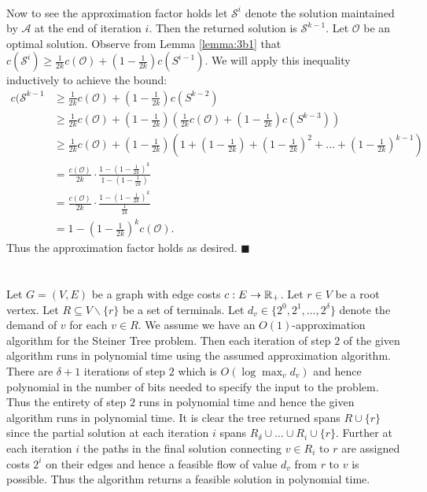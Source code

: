 \documentclass[letterpaper,12pt,oneside,onecolumn]{article}
\newcommand{\cA}{\mathcal{A}} \newcommand{\cB}{\mathcal{B}}
\newcommand{\cO}{\mathcal{O}} \newcommand{\cP}{\mathcal{P}}
\newcommand{\cS}{\mathcal{S}} \newcommand{\cT}{\mathcal{T}}
\begin{document}
\paragraph{} 
Now to see the approximation factor holds let $\cS^i$ denote the solution maintained by $\cA$ at the end of iteration $i$. Then the returned solution is $\cS^{k-1}$. Let $\cO$ be an optimal solution. Observe from Lemma \ref{lemma:3b1} that $c(\cS^{i}) \geq \frac{1}{2k} c(\cO) + (1- \frac{1}{2k})c(S^{i-1})$. We will apply this inequality inductively to achieve the bound:
\begin{align*}
c(\cS^{k-1} &\geq \frac{1}{2k} c(\cO) + (1- \frac{1}{2k})c(S^{k-2}) \\
		&\geq \frac{1}{2k} c(\cO) + (1- \frac{1}{2k})(\frac{1}{2k} c(\cO) + (1- \frac{1}{2k})c(S^{k-3})) \\
		&\geq \frac{1}{2k} c(\cO) + (1- \frac{1}{2k})(1 + (1-\frac{1}{2k}) + (1-\frac{1}{2k})^2 + \dots + (1-\frac{1}{2k})^{k-1}) \\
		&= \frac{c(\cO)}{2k} \cdot \frac{1-(1-\frac{1}{2k})^k}{1-(1-\frac{1}{2k})} \\
		&=\frac{c(\cO)}{2k} \cdot \frac{1-(1-\frac{1}{2k})^k}{\frac{1}{2k}}\\
		&= 1-(1-\frac{1}{2k})^kc(\cO).
\end{align*}
Thus the approximation factor holds as desired. $\blacksquare$
\section{}
\paragraph{}
Let $G = (V,E)$ be a graph with edge costs $c: E \rightarrow \mathbb{R}_+$. Let $r \in V$ be a root vertex. Let $R \subseteq V \backslash \{r\}$ be a set of terminals. Let $d_v \in \{2^0, 2^1, \dots, 2^\delta\}$ denote the demand of $v$ for each $v \in R$. We assume we have an $O(1)$-approximation algorithm for the Steiner Tree problem. Then each iteration of step $2$ of the given algorithm runs in polynomial time using the assumed approximation algorithm. There are $\delta+1$ iterations of step $2$ which is $O(\log \max_v d_v)$ and hence polynomial in the number of bits needed to specify the input to the problem. Thus the entirety of step $2$ runs in polynomial time and hence the given algorithm runs in polynomial time. It is clear the tree returned spans $R \cup \{r\}$ since the partial solution at each iteration $i$ spans $R_\delta \cup \dots \cup R_i \cup \{r\}$. Further at each iteration $i$ the paths in the final solution connecting $v \in R_i$ to $r$ are assigned costs $2^i$ on their edges and hence a feasible flow of value $d_v$ from $r$ to $v$ is possible. Thus the algorithm returns a feasible solution in polynomial time.
\end{document}
